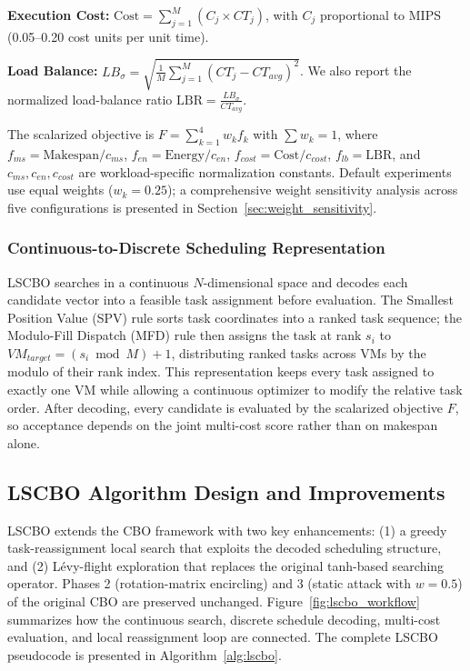 \documentclass[pdflatex,onecolumn,sn-mathphys-num]{sn-jnl}
\begin{document}
\textbf{Execution Cost:} $\text{Cost} = \sum_{j=1}^{M} (C_j \times CT_j)$, with $C_j$ proportional to MIPS (0.05--0.20 cost units per unit time).

\textbf{Load Balance:} $LB_{\sigma} = \sqrt{\frac{1}{M}\sum_{j=1}^{M}(CT_j - CT_{avg})^2}$. We also report the normalized load-balance ratio $\text{LBR} = \frac{LB_{\sigma}}{CT_{avg}}$.

The scalarized objective is $F = \sum_{k=1}^{4} w_k f_k$ with $\sum w_k = 1$, where $f_{ms} = \text{Makespan}/c_{ms}$, $f_{en} = \text{Energy}/c_{en}$, $f_{cost} = \text{Cost}/c_{cost}$, $f_{lb} = \text{LBR}$, and $c_{ms}, c_{en}, c_{cost}$ are workload-specific normalization constants. Default experiments use equal weights ($w_k = 0.25$); a comprehensive weight sensitivity analysis across five configurations is presented in Section~\ref{sec:weight_sensitivity}.

\subsubsection{Continuous-to-Discrete Scheduling Representation}
LSCBO searches in a continuous $N$-dimensional space and decodes each candidate vector into a feasible task assignment before evaluation. The Smallest Position Value (SPV) rule sorts task coordinates into a ranked task sequence; the Modulo-Fill Dispatch (MFD) rule then assigns the task at rank $s_i$ to $VM_{target} = (s_i \bmod M) + 1$, distributing ranked tasks across VMs by the modulo of their rank index. This representation keeps every task assigned to exactly one VM while allowing a continuous optimizer to modify the relative task order. After decoding, every candidate is evaluated by the scalarized objective $F$, so acceptance depends on the joint multi-cost score rather than on makespan alone.

\subsection{LSCBO Algorithm Design and Improvements}
LSCBO extends the CBO framework with two key enhancements: (1) a greedy task-reassignment local search that exploits the decoded scheduling structure, and (2) L\'{e}vy-flight exploration that replaces the original tanh-based searching operator. Phases 2 (rotation-matrix encircling) and 3 (static attack with $w=0.5$) of the original CBO are preserved unchanged. Figure~\ref{fig:lscbo_workflow} summarizes how the continuous search, discrete schedule decoding, multi-cost evaluation, and local reassignment loop are connected. The complete LSCBO pseudocode is presented in Algorithm~\ref{alg:lscbo}.
\end{document}
